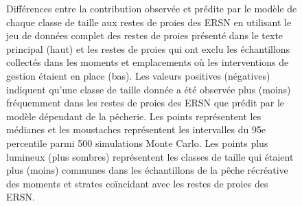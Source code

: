 \begin{figure}[H]
    \centering
    \caption{Différences entre la contribution observée et prédite par le modèle de chaque classe de taille aux restes de proies des ERSN en utilisant le jeu de données complet des restes de proies présenté dans le texte principal (haut) et les restes de proies qui ont exclu les échantillons collectés dans les moments et emplacements où les interventions de gestion étaient en place (bas). Les valeurs positives (négatives) indiquent qu'une classe de taille donnée a été observée plus (moins) fréquemment dans les restes de proies des ERSN que prédit par le modèle dépendant de la pêcherie. Les points représentent les médianes et les moustaches représentent les intervalles du 95e percentile parmi 500 simulations Monte Carlo. Les points plus lumineux (plus sombres) représentent les classes de taille qui étaient plus (moins) communes dans les échantillons de la pêche récréative des moments et strates coïncidant avec les restes de proies des ERSN.}
    \label{fig:comb-sel-size2}
\end{figure}

